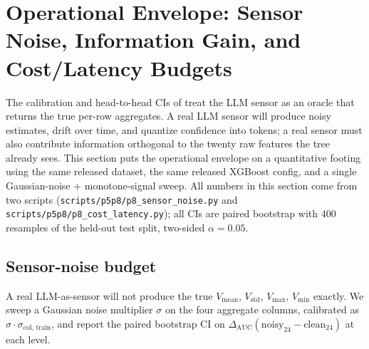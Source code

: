 \section{Operational Envelope: Sensor Noise, Information Gain, and Cost/Latency Budgets}
\label{sec:p8-evidence-noise}

The calibration and head-to-head CIs of  treat the
LLM sensor as an oracle that returns the true per-row aggregates. A real
LLM sensor will produce noisy estimates, drift over time, and quantize
confidence into tokens; a real sensor must also contribute information
orthogonal to the twenty raw features the tree already sees. This section
puts the operational envelope on a quantitative footing using the same
released dataset, the same released XGBoost config, and a single
Gaussian-noise + monotone-signal sweep. All numbers in this section come
from two scripts (\texttt{scripts/p5p8/p8\_sensor\_noise.py} and
\texttt{scripts/p5p8/p8\_cost\_latency.py}); all CIs are paired bootstrap
with $400$ resamples of the held-out test split, two-sided $\alpha{=}0.05$.

\subsection{Sensor-noise budget}

A real LLM-as-sensor will not produce the true $V_{\text{mean}}$,
$V_{\text{std}}$, $V_{\text{max}}$, $V_{\text{min}}$ exactly. We sweep a
Gaussian noise multiplier $\sigma$ on the four aggregate columns,
calibrated as $\sigma \cdot \sigma_{\text{col, train}}$, and report the
paired bootstrap CI on
$\Delta_{\text{AUC}}(\text{noisy}_{24} - \text{clean}_{24})$ at each
level.

